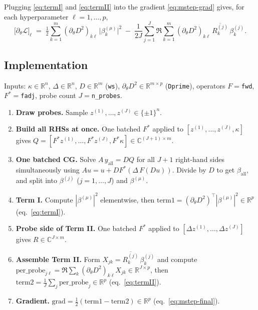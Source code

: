 \documentclass{article}
\newcommand{\R}{\mathbb{R}}
\newcommand{\C}{\mathbb{C}}
\begin{document}
Plugging \eqref{eq:termI} and \eqref{eq:termII} into the gradient \eqref{eq:mstep-grad} gives, for each hyperparameter $\ell=1,\ldots,p$,
\begin{equation}
\boxed{\;
  \bigl[\partial_\theta\mathcal{L}\bigr]_\ell
  \;=\;
  \tfrac12\sum_{k=1}^{m}(\partial_\theta D^{2})_{k\ell}\,\bigl|\beta^{(\mu)}_{k}\bigr|^{2}
  \;-\;
  \frac{1}{2J}\sum_{j=1}^{J}\Re\!\sum_{k=1}^{m}
  (\partial_\theta D^{2})_{k\ell}\,\overline{R^{(j)}_{k}}\,\beta^{(j)}_{k}.
\;}
\label{eq:mstep-final}
\end{equation}

\subsection{Implementation}
\label{sec:mstep-impl}

Inputs: $\kappa\in\R^{n}$, $\Delta\in\R^{n}$, $D\in\R^{m}$ (\texttt{ws}), $\partial_\theta D^{2}\in\R^{m\times p}$ (\texttt{Dprime}), operators $F=$\texttt{fwd}, $F^{*}=$\texttt{fadj}, probe count $J=$\texttt{n\_probes}.

\begin{enumerate}[leftmargin=1.6em,itemsep=2pt]
  \item \textbf{Draw probes.} Sample $z^{(1)},\ldots,z^{(J)}\in\{\pm1\}^{n}$.
  \item \textbf{Build all RHSs at once.} One batched $F^{*}$ applied to $[z^{(1)},\ldots,z^{(J)},\kappa]$ gives
    $Q=[F^{*}z^{(1)},\ldots,F^{*}z^{(J)},F^{*}\kappa]\in\C^{(J+1)\times m}$.
  \item \textbf{One batched CG.} Solve $A\,y_{\text{all}}=D Q$ for all $J{+}1$ right-hand sides simultaneously using $A u = u + D F^{*}(\Delta\,F(Du))$. Divide by $D$ to get $\beta_{\text{all}}$, and split into $\beta^{(j)}$ ($j=1,\ldots,J$) and $\beta^{(\mu)}$.
  \item \textbf{Term I.} Compute $|\beta^{(\mu)}|^{2}$ elementwise, then
    $\text{term1}=(\partial_\theta D^{2})^{\top}|\beta^{(\mu)}|^{2}\in\R^{p}$ (eq.~\eqref{eq:termI}).
  \item \textbf{Probe side of Term II.} One batched $F^{*}$ applied to $[\Delta z^{(1)},\ldots,\Delta z^{(J)}]$ gives $R\in\C^{J\times m}$.
  \item \textbf{Assemble Term II.} Form $X_{jk}=\overline{R^{(j)}_{k}}\,\beta^{(j)}_{k}$ and compute
    $\text{per\_probe}_{j\ell}=\Re\sum_{k}(\partial_\theta D^{2})_{k\ell}X_{jk}\in\R^{J\times p}$,
    then $\text{term2}=\tfrac{1}{J}\sum_j\text{per\_probe}_j\in\R^{p}$ (eq.~\eqref{eq:termII}).
  \item \textbf{Gradient.} $\text{grad}=\tfrac12(\text{term1}-\text{term2})\in\R^{p}$ (eq.~\eqref{eq:mstep-final}).
\end{enumerate}
\end{document}
